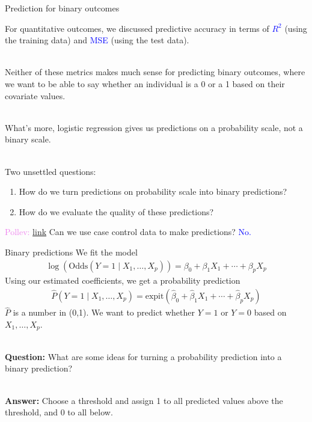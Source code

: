 \documentclass[10pt,t]{beamer}
\begin{document}
\begin{frame}{Prediction for binary outcomes}
	
	\vspace{-5 mm}
	
	For quantitative outcomes, we discussed predictive accuracy in terms of \textcolor{blue}{$R^2$} (using the training data) and \textcolor{blue}{MSE} (using the test data).  
	\\ ~\
	
	Neither of these metrics makes much sense for predicting binary outcomes, where we want to be able to say whether an individual is a 0 or a 1 based on their covariate values.  
	\\ ~\
	
	What's more, logistic regression gives us predictions on a probability scale, not a binary scale.  
	\\ ~\
	
	Two unsettled questions: 
	\begin{enumerate}
		\item How do we turn predictions on probability scale into binary predictions?  
		\item How do we evaluate the quality of these predictions? 
	\end{enumerate}

\bigskip

\textcolor{violet}{Pollev: \href{https://PollEv.com/multiple_choice_polls/RrcDDezBoaDcZesDbQOdt/respond}{link} } Can we use case control data to make predictions? \pause\textcolor{blue}{No.}

\end{frame}


\begin{frame}{Binary predictions}
	We fit the model
	\begin{align*}
		\log(\text{Odds}(Y = 1 \mid X_1, \dots, X_p)) = \beta_0 + \beta_1X_1 + \cdots + \beta_pX_p
	\end{align*} 
	Using our estimated coefficients, we get a probability prediction
	\begin{align*}
		\widehat{P}(Y = 1 \mid X_1, \dots, X_p) = \text{expit}(\hat{\beta}_0 + \hat{\beta}_1X_1 + \cdots + \hat{\beta}_pX_p)
	\end{align*} 
	$\hat{P}$ is a number in (0,1). We want to predict whether $Y = 1$ or $Y = 0$ based on $X_1,\dots, X_p$. 
	\\ ~\ 
	
	\textbf{Question:} What are some ideas for turning a probability prediction into a binary prediction? 
	\\ ~\  
	
	\textbf{Answer:} Choose a threshold and assign 1 to all predicted values above the threshold, and 0 to all below. 
\end{frame}
\end{document}

